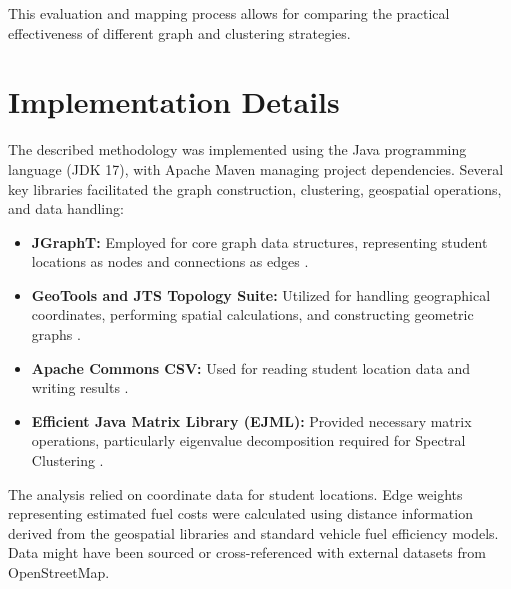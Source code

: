This evaluation and mapping process allows for comparing the practical effectiveness of different graph and clustering strategies.

\section{Implementation Details}
\label{sec:implementation}

The described methodology was implemented using the Java programming language (JDK 17), with Apache Maven managing project dependencies. Several key libraries facilitated the graph construction, clustering, geospatial operations, and data handling:
\begin{itemize}
    \item \textbf{JGraphT:} Employed for core graph data structures, representing student locations as nodes and connections as edges \cite{jgrapht}.
    \item \textbf{GeoTools and JTS Topology Suite:} Utilized for handling geographical coordinates, performing spatial calculations, and constructing geometric graphs \cite{geotools, jts}.
    \item \textbf{Apache Commons CSV:} Used for reading student location data and writing results \cite{commonscsv}.
    \item \textbf{Efficient Java Matrix Library (EJML):} Provided necessary matrix operations, particularly eigenvalue decomposition required for Spectral Clustering \cite{ejml}.
\end{itemize}

The analysis relied on coordinate data for student locations. Edge weights representing estimated fuel costs were calculated using distance information derived from the geospatial libraries and standard vehicle fuel efficiency models. Data might have been sourced or cross-referenced with external datasets from OpenStreetMap.




